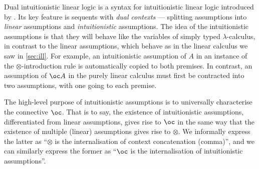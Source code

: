 Dual intuitionistic linear logic is a syntax for intuitionistic linear logic
introduced by \citep{Barber1997}.
Its key feature is sequents with \emph{dual contexts} --- splitting assumptions
into \emph{linear} assumptions and \emph{intuitionistic} assumptions.
The idea of the intuitionistic assumptions is that they will behave like the
variables of simply typed $\lambda$-calculus, in contrast to the linear
assumptions, which behave as in the linear calculus we saw in \autoref{sec:ill}.
For example, an intuitionistic assumption of $A$ in an instance of the
$\otimes$-introduction rule is automatically copied to both premises.
In contrast, an assumption of $\oc A$ in the purely linear calculus must first
be contracted into two assumptions, with one going to each premise.

The high-level purpose of intuitionistic assumptions is to universally
characterise the connective $\oc$.
That is to say, the existence of intuitionistic assumptions, differentiated from
linear assumptions, gives rise to $\oc$ in the same way that the existence of
multiple (linear) assumptions gives rise to $\otimes$.
We informally express the latter as ``$\otimes$ is the internalisation of
context concatenation (comma)'', and we can similarly express the former as
``$\oc$ is the internalisation of intuitionistic assumptions''.

